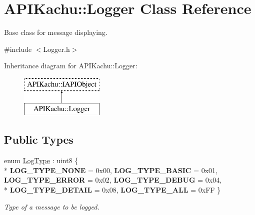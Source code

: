 \hypertarget{class_a_p_i_kachu_1_1_logger}{}\section{A\+P\+I\+Kachu\+:\+:Logger Class Reference}
\label{class_a_p_i_kachu_1_1_logger}


Base class for message displaying.  




{\ttfamily \#include $<$Logger.\+h$>$}

Inheritance diagram for A\+P\+I\+Kachu\+:\+:Logger\+:\begin{figure}[H]
\begin{center}
\leavevmode
\includegraphics[height=2.000000cm]{class_a_p_i_kachu_1_1_logger}
\end{center}
\end{figure}
\subsection*{Public Types}
\begin{DoxyCompactItemize}
\item 
enum \hyperlink{class_a_p_i_kachu_1_1_logger_af1782b2d51f63b086775b671b3c8de52}{Log\+Type} \+: uint8 \{ \\*
{\bfseries L\+O\+G\+\_\+\+T\+Y\+P\+E\+\_\+\+N\+O\+NE} = 0x00, 
{\bfseries L\+O\+G\+\_\+\+T\+Y\+P\+E\+\_\+\+B\+A\+S\+IC} = 0x01, 
{\bfseries L\+O\+G\+\_\+\+T\+Y\+P\+E\+\_\+\+E\+R\+R\+OR} = 0x02, 
{\bfseries L\+O\+G\+\_\+\+T\+Y\+P\+E\+\_\+\+D\+E\+B\+UG} = 0x04, 
\\*
{\bfseries L\+O\+G\+\_\+\+T\+Y\+P\+E\+\_\+\+D\+E\+T\+A\+IL} = 0x08, 
{\bfseries L\+O\+G\+\_\+\+T\+Y\+P\+E\+\_\+\+A\+LL} = 0x\+FF
 \}\begin{DoxyCompactList}\small\item\em Type of a message to be logged. \end{DoxyCompactList}
\end{DoxyCompactItemize}

